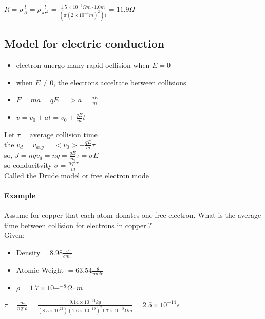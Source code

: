 \documentclass{article}
\begin{document}
    \paragraph{}$R = \rho \frac{l}{A} = \rho \frac{l}{\pi r^2} = \frac{1.5 \times 10^{-6}\Omega m \cdot 1.0 m}{(\pi (2\times 10^{-4}m)^2))} = 11.9 \Omega$    
   
    \subsection{Model for electric conduction}
    \begin{itemize}
        \item electron unergo many rapid ocllision when  $E = 0$
        \item when $E \neq 0$, the electrons accelrate between collisions
        \item $F = ma = qE => a = \frac{qE}{m}$
        \item $v = v_0 + at= v_0 + \frac{qE}{m}t $
    \end{itemize}
    Let $\tau = \text{average collision time}$\\
    the  $v_d = v_{avg} = <v_0> + \frac{qE}{m}\tau$\\
    so, $J = nqv_d = nq = \frac{qE}{m}\tau = \sigma E$\\
    so conducitvity $\sigma = \frac{nq^2\tau}{m}$\\
    Called the Drude model or free electron mode\\
    \paragraph{Example} Assume for copper that each atom donates one free electron. What is the average time between collision for electrons in copper.?
    \\Given: 
    \begin{itemize}
        \item Density$ = 8.98\frac{g}{cm^3}$
        \item Atomic Weight $ = 63.54\frac{g}{mole}$
        \item $\rho = 1.7 \times 10-^{-8}\Omega\cdot m$
    \end{itemize}
    $\tau = \frac{m}{nq^2\rho}=\frac{9.14 \times 10^{-31}kg}{(8.5\times10^22 ) (1.6\times10^{-19})^2 1.7\times10^{-8}\Omega m} = 2.5\times10^{-14}s$
\end{document}
